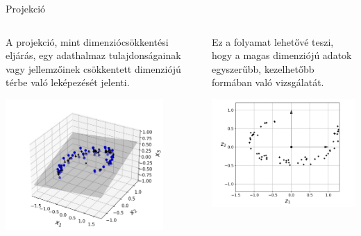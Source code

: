 \documentclass[english, aspectratio=169]{beamer}
\begin{document}
\begin{frame}{Projekció}
\begin{columns}
\begin{column}{.5\textwidth}
A projekció, mint dimenziócsökkentési eljárás, egy adathalmaz tulajdonságainak vagy jellemzőinek csökkentett dimenziójú térbe való leképezését jelenti.
\begin{center}
\includegraphics[width=6cm, keepaspectratio]{images/unsupervised_3.png}
\end{center}
\end{column}
\begin{column}{.5\textwidth}
Ez a folyamat lehetővé teszi, hogy a magas dimenziójú adatok egyszerűbb, kezelhetőbb formában való vizsgálatát. 
\begin{center}
\includegraphics[width=6cm, keepaspectratio]{images/unsupervised_4.png}
\end{center}
\end{column}
\end{columns}
\end{frame}
\end{document}
